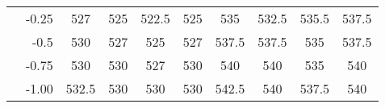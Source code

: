\begin{tabular}{l | r | cccc || cccc}
    & -0.25 & \cellcolor{white!20!gray}527    & \cellcolor{white!44!gray}525    & \cellcolor{white!52!gray}522.5  & \cellcolor{white!44!gray}525    & \cellcolor{white!45!orange}535    & \cellcolor{white!56!orange}532.5  & \cellcolor{white!34!orange}535.5  & \cellcolor{white!23!orange}537.5  \\
    & -0.5  & \cellcolor{white!12!gray}530    & \cellcolor{white!20!gray}527    & \cellcolor{white!44!gray}525    & \cellcolor{white!20!gray}527    & \cellcolor{white!23!orange}537.5  & \cellcolor{white!23!orange}537.5  & \cellcolor{white!45!orange}535    & \cellcolor{white!23!orange}537.5  \\
    & -0.75 & \cellcolor{white!12!gray}530    & \cellcolor{white!12!gray}530    & \cellcolor{white!20!gray}527    & \cellcolor{white!12!gray}530    & \cellcolor{white!12!orange}540    & \cellcolor{white!12!orange}540    & \cellcolor{white!45!orange}535    & \cellcolor{white!12!orange}540    \\
    & -1.00 & \cellcolor{white!8!gray}532.5   & \cellcolor{white!12!gray}530    & \cellcolor{white!12!gray}530    & \cellcolor{white!12!gray}530    & \cellcolor{white!1!orange}542.5   & \cellcolor{white!12!orange}540    & \cellcolor{white!23!orange}537.5  & \cellcolor{white!12!orange}540    \\
\hline\hline
\end{tabular}
